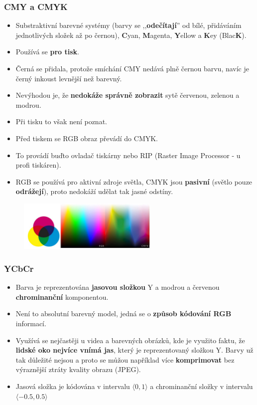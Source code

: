 \subsubsection{CMY a CMYK}
\begin{itemize}
	\item Substraktivní barevné systémy (barvy se ,,\textbf{odečítají}'' od bílé, přidáváním jednotlivých složek až po černou), \textbf{C}yan, \textbf{M}agenta, \textbf{Y}ellow a \textbf{K}ey (Blac\textbf{K}).
	\item Používá se \textbf{pro tisk}.
	\item Černá se přidala, protože smíchání CMY nedává plně černou barvu, navíc je černý inkoust levnější než barevný.
	\item Nevýhodou je, že \textbf{nedokáže správně zobrazit} sytě červenou, zelenou a modrou.
	\item Při tisku to však není poznat.
	\item Před tiskem se RGB obraz převádí do CMYK.
	\item To provádí buďto ovladač tiskárny nebo RIP (Raster Image Processor - u profi tiskáren).
	\item RGB se používá pro aktivní zdroje světla, CMYK jsou \textbf{pasivní} (světlo pouze \textbf{odrážejí}), proto nedokáží udělat tak jasné odstíny.
\end{itemize}
	\begin{figure}[H]
	\centering
	\includegraphics[width=0.6\textwidth]{assets/1_cmyk}
	\end{figure}

\subsubsection{YCbCr}
\begin{itemize}
	\item Barva je reprezentována \textbf{jasovou složkou} Y a modrou a červenou \textbf{chrominanční} komponentou.
	\item Není to absolutní barevný model, jedná se o \textbf{způsob kódování RGB} informací.
	\item Využívá se nejčastěji u videa a barevných obrázků, kde je využito faktu, že \textbf{lidské oko nejvíce vnímá jas}, který je reprezentovaný složkou Y. Barvy už tak důležité nejsou a proto se můžou například více \textbf{komprimovat} bez výraznější ztráty kvality obrazu (JPEG).
	\item Jasová složka je kódována v intervalu $\langle0, 1\rangle$ a chrominanční složky v intervalu $\langle-0.5, 0.5\rangle$
\end{itemize}